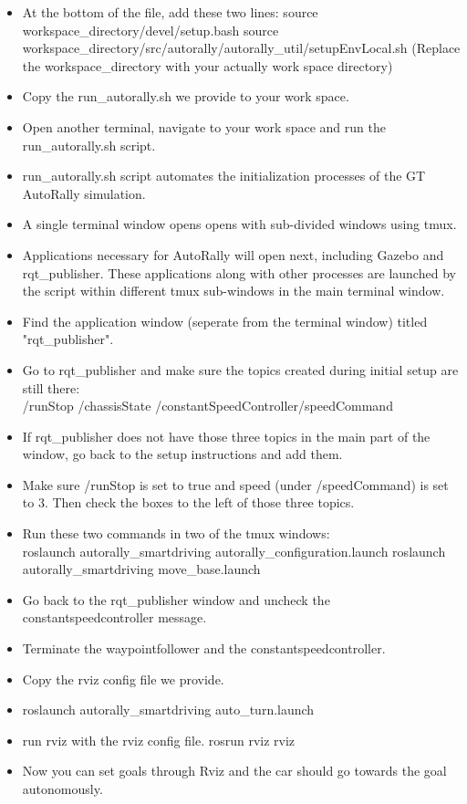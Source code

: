 \documentclass[compsoc,draftclsnofoot,onecolumn,10pt]{IEEEtran}
\begin{document}
\begin{itemize}
    	\item At the bottom of the file, add these two lines: source workspace\_directory/devel/setup.bash source workspace\_directory/src/autorally/autorally\_util/setupEnvLocal.sh (Replace the workspace\_directory with your actually work space directory)
    	\item Copy the run\_autorally.sh we provide to your work space.
    	\item Open another terminal, navigate to your work space and run the run\_autorally.sh script.
    	\item run\_autorally.sh script automates the initialization processes of the GT AutoRally simulation.
    	\item A single terminal window opens opens with sub-divided windows using tmux.
    	\item Applications necessary for AutoRally will open next, including Gazebo and rqt\_publisher. These applications along with other processes are launched by the script within different tmux sub-windows in the main terminal window.
    	\item Find the application window (seperate from the terminal window) titled "rqt\_publisher".
    	\item Go to rqt\_publisher and make sure the topics created during initial setup are still there:\\ /runStop /chassisState /constantSpeedController/speedCommand
    	\item If rqt\_publisher does not have those three topics in the main part of the window, go back to the setup instructions and add them.
    	\item Make sure /runStop is set to true and speed (under /speedCommand) is set to 3. Then check the boxes to the left of those three topics.
    	\item Run these two commands in two of the tmux windows:\\ roslaunch autorally\_smartdriving autorally\_configuration.launch roslaunch autorally\_smartdriving move\_base.launch
    	\item Go back to the rqt\_publisher window and uncheck the constantspeedcontroller message.
    	\item Terminate the waypointfollower and the constantspeedcontroller.
    	\item Copy the rviz config file we provide.
    	\item roslaunch autorally\_smartdriving auto\_turn.launch
    	\item run rviz with the rviz config file. rosrun rviz rviz
    	\item Now you can set goals through Rviz and the car should go towards the goal autonomously.
    \end{itemize}
    
\end{document}
